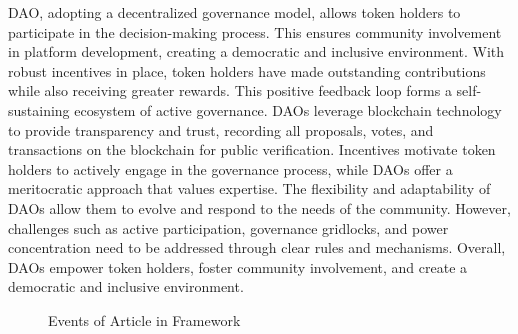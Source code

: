 \documentclass[lettersize,journal]{IEEEtran}
\begin{document}
DAO, adopting a decentralized governance model, allows token holders to participate in the decision-making process. This ensures community involvement in platform development, creating a democratic and inclusive environment. With robust incentives in place, token holders have made outstanding contributions while also receiving greater rewards. This positive feedback loop forms a self-sustaining ecosystem of active governance. DAOs leverage blockchain technology to provide transparency and trust, recording all proposals, votes, and transactions on the blockchain for public verification. Incentives motivate token holders to actively engage in the governance process, while DAOs offer a meritocratic approach that values expertise. The flexibility and adaptability of DAOs allow them to evolve and respond to the needs of the community. However, challenges such as active participation, governance gridlocks, and power concentration need to be addressed through clear rules and mechanisms. Overall, DAOs empower token holders, foster community involvement, and create a democratic and inclusive environment.

\begin{figure}[ht]
  \caption{Events of Article in Framework}
  \label{fig:decentralized_governance}
\end{figure}
\end{document}
